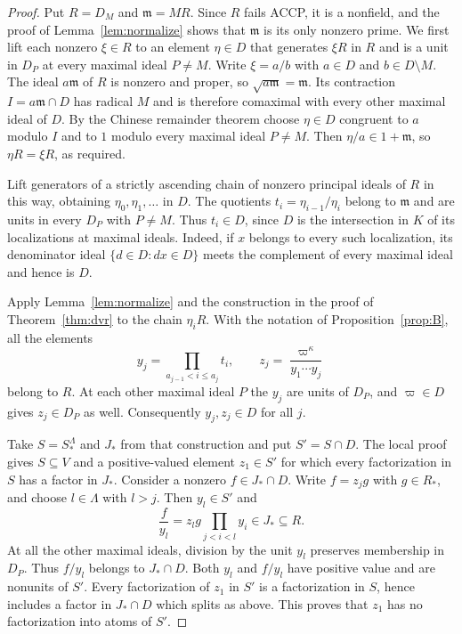 \documentclass[11pt, letterpaper]{article}
\theoremstyle{definition}
\theoremstyle{remark}
\begin{document}
\begin{proof}
    Put $R = D_{M}$ and $\mathfrak{m} = MR$.
    Since $R$ fails ACCP, it is a nonfield, and the proof of Lemma~\ref{lem:normalize} shows that $\mathfrak{m}$ is its only nonzero prime.
    We first lift each nonzero $\xi \in R$ to an element $\eta \in D$ that generates $\xi R$ in $R$ and is a unit in $D_{P}$ at every maximal ideal $P \ne M$.
    Write $\xi = a/b$ with $a \in D$ and $b \in D \setminus M$.
    The ideal $a\mathfrak{m}$ of $R$ is nonzero and proper, so $\sqrt{a\mathfrak{m}} = \mathfrak{m}$.
    Its contraction $I = a\mathfrak{m} \cap D$ has radical $M$ and is therefore comaximal with every other maximal ideal of $D$.
    By the Chinese remainder theorem choose $\eta \in D$ congruent to $a$ modulo $I$ and to $1$ modulo every maximal ideal $P \ne M$.
    Then $\eta/a \in 1 + \mathfrak{m}$, so $\eta R = \xi R$, as required.

    Lift generators of a strictly ascending chain of nonzero principal ideals of $R$ in this way, obtaining $\eta_{0}, \eta_{1}, \dots$ in $D$.
    The quotients $t_{i} = \eta_{i - 1}/\eta_{i}$ belong to $\mathfrak{m}$ and are units in every $D_{P}$ with $P \ne M$.
    Thus $t_{i} \in D$, since $D$ is the intersection in $K$ of its localizations at maximal ideals.
    Indeed, if $x$ belongs to every such localization, its denominator ideal $\{d \in D : dx \in D\}$ meets the complement of every maximal ideal and hence is $D$.

    Apply Lemma~\ref{lem:normalize} and the construction in the proof of Theorem~\ref{thm:dvr} to the chain $\eta_{i}R$.
    With the notation of Proposition~\ref{prop:B}, all the elements
    \[
        y_{j} = \prod_{a_{j - 1} < i \le a_{j}} t_{i},
        \qquad z_{j} = \frac{\varpi^{\kappa}}{y_{1}\cdots y_{j}}
    \]
    belong to $R$.
    At each other maximal ideal $P$ the $y_{j}$ are units of $D_{P}$, and $\varpi \in D$ gives $z_{j} \in D_{P}$ as well.
    Consequently $y_{j}, z_{j} \in D$ for all $j$.

    Take $S = S_{*}^{\Lambda}$ and $J_{*}$ from that construction and put $S' = S \cap D$.
    The local proof gives $S \subseteq V$ and a positive-valued element $z_{1} \in S'$ for which every factorization in $S$ has a factor in $J_{*}$.
    Consider a nonzero $f \in J_{*} \cap D$.
    Write $f = z_{j}g$ with $g \in R_{*}$, and choose $l \in \Lambda$ with $l > j$.
    Then $y_{l} \in S'$ and
    \[
        \frac{f}{y_{l}} = z_{l}g\prod_{j < i < l} y_{i} \in J_{*} \subseteq R.
    \]
    At all the other maximal ideals, division by the unit $y_{l}$ preserves membership in $D_{P}$.
    Thus $f/y_{l}$ belongs to $J_{*} \cap D$.
    Both $y_{l}$ and $f/y_{l}$ have positive value and are nonunits of $S'$.
    Every factorization of $z_{1}$ in $S'$ is a factorization in $S$, hence includes a factor in $J_{*} \cap D$ which splits as above.
    This proves that $z_{1}$ has no factorization into atoms of $S'$.
\end{proof}
\end{document}
